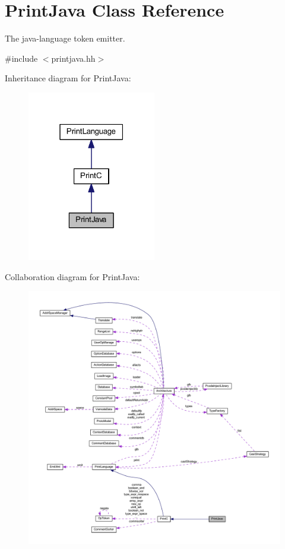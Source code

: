 \hypertarget{class_print_java}{}\section{Print\+Java Class Reference}
\label{class_print_java}


The java-\/language token emitter.  




{\ttfamily \#include $<$printjava.\+hh$>$}



Inheritance diagram for Print\+Java\+:
\nopagebreak
\begin{figure}[H]
\begin{center}
\leavevmode
\includegraphics[width=159pt]{class_print_java__inherit__graph}
\end{center}
\end{figure}


Collaboration diagram for Print\+Java\+:
\nopagebreak
\begin{figure}[H]
\begin{center}
\leavevmode
\includegraphics[width=350pt]{class_print_java__coll__graph}
\end{center}
\end{figure}
